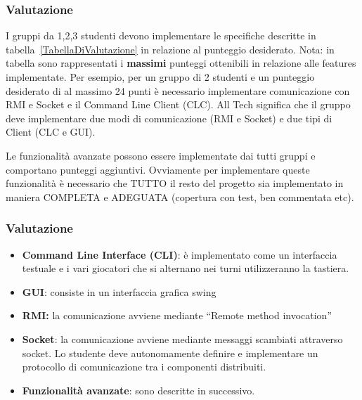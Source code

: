 \documentclass{beamer}
\begin{document}
\begin{frame}
\frametitle{Valutazione}
I gruppi da 1,2,3 studenti devono implementare  le specifiche
descritte in tabella~\ref{TabellaDiValutazione} in relazione al
punteggio desiderato. Nota: in tabella sono rappresentati i
\textbf{massimi} punteggi ottenibili in relazione alle features
implementate. Per esempio, per un gruppo di 2 studenti e un punteggio
desiderato di al massimo 24 punti \`e necessario implementare
comunicazione con RMI e Socket e il Command Line Client (CLC).
All Tech significa che il gruppo deve implementare due modi di
comunicazione (RMI e Socket) e due tipi di Client (CLC e GUI).

Le funzionalit\`a avanzate possono essere implementate dai tutti gruppi e comportano punteggi aggiuntivi. Ovviamente per implementare queste funzionalit\`a \`e necessario che TUTTO il resto del progetto sia implementato in maniera COMPLETA e ADEGUATA (copertura con test, ben commentata etc).
\end{frame}



\begin{frame}
\frametitle{Valutazione}
\begin{itemize}
\item \textbf{Command Line Interface (CLI)}: \`e implementato come un interfaccia testuale e i vari giocatori che si alternano nei turni utilizzeranno la tastiera.
\item \textbf{GUI}: consiste in un interfaccia grafica swing
\item \textbf{RMI:} la comunicazione avviene mediante ``Remote method invocation''
\item \textbf{Socket}: la comunicazione avviene mediante messaggi scambiati
  attraverso socket. Lo studente deve autonomamente definire e
  implementare un protocollo di comunicazione tra i componenti distribuiti.
\item \textbf{Funzionalit\`a avanzate}: sono descritte in successivo.
\end{itemize}
\end{frame}
\end{document}

